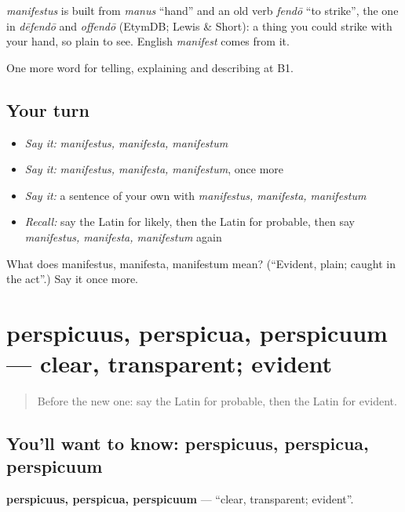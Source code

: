 \begin{cousinweb}
\emph{manifestus} is built from \emph{manus} \textquotedblleft{}hand\textquotedblright{} and an old verb \emph{fendō} \textquotedblleft{}to strike\textquotedblright{}, the one in \emph{dēfendō} and \emph{offendō} (EtymDB; Lewis \& Short): a thing you could strike with your hand, so plain to see. English \emph{manifest} comes from it.
\end{cousinweb}

\begin{grammarlens}[title={What you've built}]
One more word for telling, explaining and describing at B1.
\end{grammarlens}

\subsection*{Your turn}
\begin{itemize}
\raggedright
  \item \emph{Say it:} \emph{manifestus, manifesta, manifestum}
  \item \emph{Say it:} \emph{manifestus, manifesta, manifestum}, once more
  \item \emph{Say it:} a sentence of your own with \emph{manifestus, manifesta, manifestum}
  \item \emph{Recall:} say the Latin for likely, then the Latin for probable, then say \emph{manifestus, manifesta, manifestum} again
\end{itemize}

\begin{tcolorbox}[breakable,colback=teal!4,colframe=teal!35!black,title={Before you move on}]
What does manifestus, manifesta, manifestum mean? (\textquotedblleft{}Evident, plain; caught in the act\textquotedblright{}.) Say it once more.
\end{tcolorbox}
\section[perspicuus, perspicua, perspicuum]{perspicuus, perspicua, perspicuum — clear, transparent; evident}

\label{lesson:LA-C360-perspicuus}



\begin{quote}
Before the new one: say the Latin for probable, then the Latin for evident.
\end{quote}

\subsection*{You'll want to know: perspicuus, perspicua, perspicuum}
\textbf{perspicuus, perspicua, perspicuum} — \textquotedblleft{}clear, transparent; evident\textquotedblright{}.

